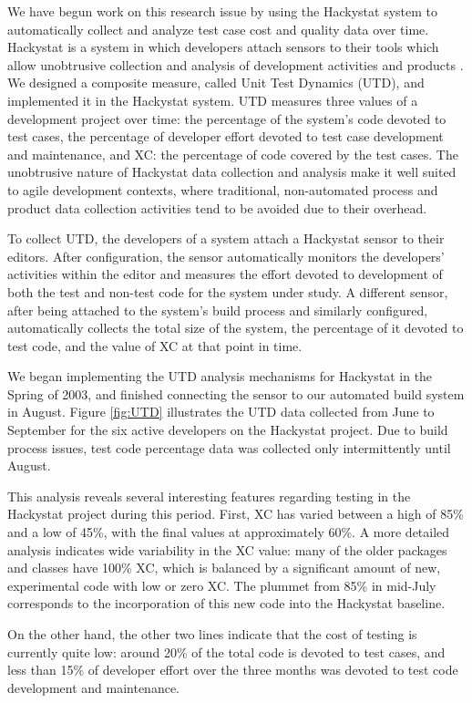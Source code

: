 \documentclass[10pt,twocolumn]{article}
\begin{document}
We have begun work on this research issue by using the Hackystat system to
automatically collect and analyze test case cost and quality data over
time. Hackystat is a system in which developers attach sensors to their
tools which allow unobtrusive collection and analysis of development
activities and products \cite{HackystatHome}.  We designed a composite measure, called Unit
Test Dynamics (UTD), and implemented it in the Hackystat system. UTD
measures three values of a development project over time: the percentage of
the system's code devoted to test cases, the percentage of developer effort
devoted to test case development and maintenance, and XC: the percentage of
code covered by the test cases.  The unobtrusive nature of Hackystat data
collection and analysis make it well suited to agile development contexts,
where traditional, non-automated process and product data collection
activities tend to be avoided due to their overhead. 

To collect UTD, the developers of a system attach a Hackystat sensor to
their editors.  After configuration, the sensor automatically monitors the
developers' activities within the editor and measures the effort devoted to
development of both the test and non-test code for the system under study.
A different sensor, after being attached to the system's build process and
similarly configured, automatically collects the total size of the system,
the percentage of it devoted to test code, and the value of XC at that
point in time.

We began implementing the UTD analysis mechanisms for Hackystat in the
Spring of 2003, and finished connecting the sensor to our automated build
system in August.  Figure \ref{fig:UTD} illustrates the UTD data collected
from June to September for the six active developers on the Hackystat
project. Due to build process issues, test code percentage data was
collected only intermittently until August. 

This analysis reveals several interesting features regarding testing in the
Hackystat project during this period. First, XC has varied between a high
of 85\% and a low of 45\%, with the final values at approximately 60\%.  A
more detailed analysis indicates wide variability in the XC value: many of
the older packages and classes have 100\% XC, which is balanced by a
significant amount of new, experimental code with low or zero XC.  The
plummet from 85\% in mid-July corresponds to the incorporation of this new
code into the Hackystat baseline.

On the other hand, the other two lines indicate that the cost of testing is
currently quite low: around 20\% of the total code is devoted to test
cases, and less than 15\% of developer effort over the three months was
devoted to test code development and maintenance.
\end{document}
